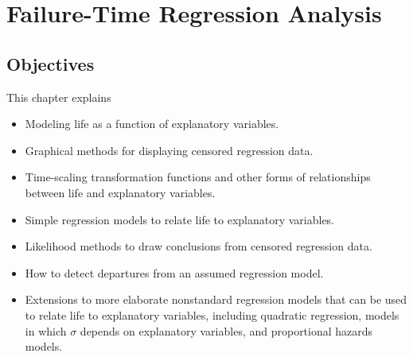 
\setcounter{chapter}{16}

\chapter{Failure-Time Regression Analysis}

\label{chapter:regression.analysis}



\section*{Objectives}
This chapter explains
\begin{itemize} 
\item 
Modeling life as a function of explanatory variables.
\item 
Graphical methods for displaying censored
regression data.
\item
Time-scaling transformation functions and other forms
of relationships between life and explanatory variables.
\item 
Simple regression models to relate life to explanatory
variables.
\item
Likelihood methods to draw conclusions from censored
regression data.
\item 
How to detect departures from an assumed regression model.
\item 
Extensions to more elaborate nonstandard regression models that can
be used to relate life to explanatory variables, including quadratic
regression, models in which $\sigma$ depends on explanatory
variables, and proportional hazards models.
\end{itemize}


